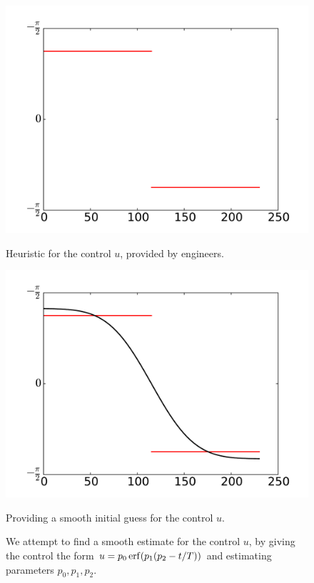 \begin{figure}
\begin{minipage}[b]{.47\linewidth}
\centering
\includegraphics[width=\textwidth]{u_heuristic.pdf}
\caption*{Heuristic for the control $u$, provided by engineers. }
\end{minipage}
\hspace{0.5cm}
\begin{minipage}[b]{0.47\linewidth}
\centering
\includegraphics[width=\textwidth]{u_heuristic_smooth.pdf}
\caption*{Providing a smooth initial guess for the control $u$.}
\end{minipage}
\caption{We attempt to find a smooth estimate for the control $u$, by giving the control the form 
$u = p_0\operatorname{erf}(p_1(p_2-t/T))$ and estimating parameters $p_0, p_1, p_2$.}
\label{fig:reentry:estimate_u}
\end{figure}





